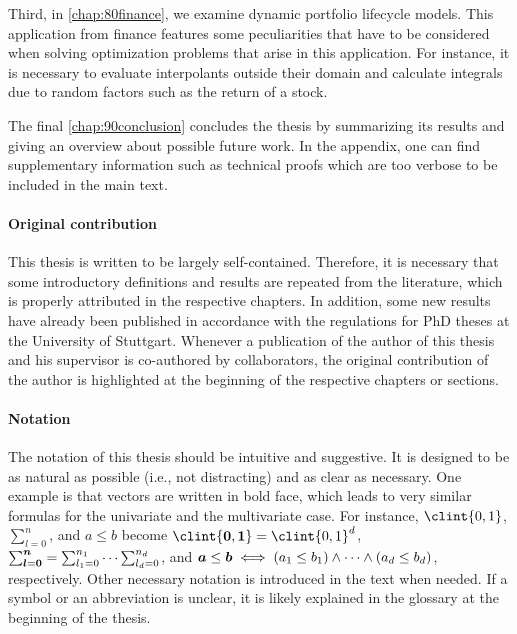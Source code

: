 Third, in \cref{chap:80finance},
we examine dynamic portfolio lifecycle models.
This application from finance features some peculiarities
that have to be considered when solving optimization problems that
arise in this application.
For instance, it is necessary to evaluate interpolants outside their domain
and calculate integrals due to random factors such as the return of a stock.

The final \cref{chap:90conclusion} concludes the thesis by
summarizing its results and
giving an overview about possible future work.
In the appendix, one can find supplementary information such as
technical proofs which are too verbose to be included in the main text.

\paragraph{Original contribution}

This thesis is written to be largely self-contained.
Therefore, it is necessary that some introductory definitions and
results are repeated from the literature,
which is properly attributed in the respective chapters.
In addition, some new results have already been published in accordance
with the regulations for PhD theses at the University of Stuttgart.
Whenever a publication of the author of this thesis and his supervisor
is co-authored by collaborators,
the original contribution of the author is highlighted 
at the beginning of the respective chapters or sections.

\paragraph{Notation}

The notation of this thesis should be intuitive and suggestive.
It is designed to be as natural as possible (i.e., not distracting)
and as clear as necessary.
One example is that vectors are written in bold face, which leads to
very similar formulas for the univariate and the multivariate case.
For instance, $\clint{0, 1}$, $\sum_{l=0}^n$, and $a \le b$ become
$\clint{\*0, \*1} = \clint{0, 1}^d$,
$\sum_{{\boldsymbol{l}}={\boldsymbol{0}}}^{{\boldsymbol{n}}} = \sum_{l_1=0}^{n_1} \dotsb \sum_{l_d=0}^{n_d}$, and
${\boldsymbol{a}} \le {\boldsymbol{b}} \iff (a_1 \le b_1) \land \dotsb \land (a_d \le b_d)$,
respectively.
Other necessary notation is introduced in the text when needed.
If a symbol or an abbreviation is unclear,
it is likely explained in the glossary at the beginning of the thesis.

\cleardoublepage
